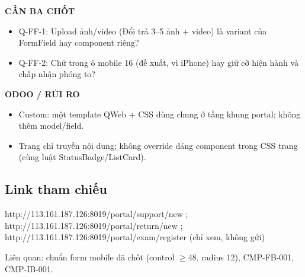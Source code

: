 \documentclass[11pt,a4paper]{report}
\begin{document}
\par\smallskip\textbf{CẦN BA CHỐT}\par
\begin{itemize}
\item Q-FF-1: Upload ảnh/\allowbreak{}video (Đổi trả 3–5 ảnh + video) là variant của FormField hay component riêng?
\item Q-FF-2: Chữ trong ô mobile 16 (đề xuất, vì iPhone) hay giữ cỡ hiện hành và chấp nhận phóng to?
\end{itemize}

\par\smallskip\textbf{ODOO / RỦI RO}\par
\begin{itemize}
\item Custom: một template QWeb + CSS dùng chung ở tầng khung portal; không thêm model/\allowbreak{}field.
\item Trang chỉ truyền nội dung; không override dáng component trong CSS trang (cùng luật StatusBadge/\allowbreak{}ListCard).
\end{itemize}
\subsection*{Link tham chiếu}
http://113.161.187.126:8019/\allowbreak{}portal/\allowbreak{}support/\allowbreak{}new ; http://113.161.187.126:8019/\allowbreak{}portal/\allowbreak{}return/\allowbreak{}new ; http://113.161.187.126:8019/\allowbreak{}portal/\allowbreak{}exam/\allowbreak{}register (chỉ xem, không gửi)\par
Liên quan: chuẩn form mobile đã chốt (control \(\geq\)48, radius 12), CMP-FB-001, CMP-IB-001.\par
\end{document}

